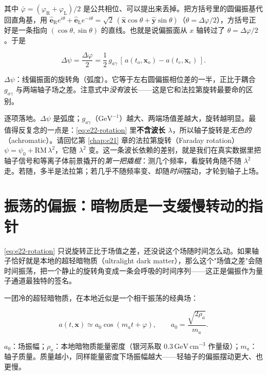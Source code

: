 其中 \(\bar\varphi=(\varphi_{\mathrm R}+\varphi_{\mathrm L})/2\) 是公共相位、可以提出来丢掉。把方括号里的圆偏振基代回直角基，用 \(\hat{\bm e}_{\mathrm R}e^{i\theta}+\hat{\bm e}_{\mathrm L}e^{-i\theta}=\sqrt2\,(\hat{\bm x}\cos\theta+\hat{\bm y}\sin\theta)\)（\(\theta=\Delta\varphi/2\)），方括号正好是一条指向 \((\cos\theta,\sin\theta)\) 的直线。也就是说偏振面从 \(x\) 轴转过了 \(\theta=\Delta\varphi/2\)。于是

\begin{equation}
  \Delta\psi = \frac{\Delta\varphi}{2}
  = \frac{1}{2}\,g_{a\gamma}\,[\,a(t_o,\bm x_o)-a(t_e,\bm x_e)\,].
  \label{eq:e22-rotation}
\end{equation}
\begin{formulaexplain}
\(\Delta\psi\)：线偏振面的旋转角（弧度）。它等于左右圆偏振相位差的一半，正比于耦合 \(g_{a\gamma}\) 与两端轴子场之差。注意式中\emph{没有}波长——这是它和法拉第旋转最要命的区别。
\end{formulaexplain}

逐项落地。\(\Delta\psi\) 是弧度；\(g_{a\gamma}\)（\(\mathrm{GeV^{-1}}\)）越大、两端场值差越大，旋转越明显。最值得反复念的一点是：\eqref{eq:e22-rotation} 里\textbf{不含波长 \(\lambda\)}，所以轴子旋转是\emph{无色的}（achromatic）。请回忆第 \ref{chap:e21} 章的法拉第旋转（Faraday rotation）\(\psi=\psi_0+\mathrm{RM}\,\lambda^2\)，它随 \(\lambda^2\) 变。这一条波长依赖的差别，就是我们在真实数据里把轴子信号和等离子体前景撬开的\emph{第一把撬棍}：测几个频率，看旋转角随不随 \(\lambda^2\) 走。若随，多半是法拉第；若几乎不随频率变、却随\emph{时间}摆动，才轮到轴子上场。


\section{振荡的偏振：暗物质是一支缓慢转动的指针}
\label{sec:e22-oscillation}

\eqref{eq:e22-rotation} 只说旋转正比于场值之差，还没说这个场随时间怎么动。如果轴子恰好就是本地的超轻暗物质（ultralight dark matter），那么这个"场值之差"会随时间振荡，把一个静止的旋转角变成一条会呼吸的时间序列——这正是偏振作为量子通道最独特的签名。

一团冷的超轻暗物质，在本地近似是一个相干振荡的经典场：

\begin{equation}
  a(t,\bm x)\simeq a_0\cos(m_a t+\varphi),
  \qquad
  a_0=\frac{\sqrt{2\rho_a}}{m_a}.
  \label{eq:e22-dm-field}
\end{equation}
\begin{formulaexplain}
\(a_0\)：场振幅；\(\rho_a\)：本地暗物质能量密度（银河系取 \(0.3\,\mathrm{GeV\,cm^{-3}}\) 作量级）；\(m_a\)：轴子质量。质量越小，同样能量密度下场振幅越大——轻轴子的偏振摆动更大、也更慢。
\end{formulaexplain}

